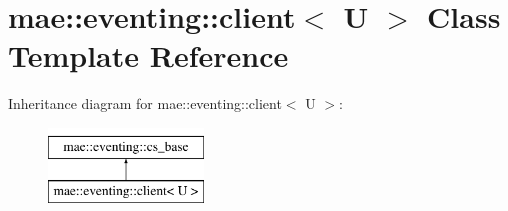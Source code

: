 \hypertarget{classmae_1_1eventing_1_1client}{\section{mae\-:\-:eventing\-:\-:client$<$ U $>$ Class Template Reference}
\label{classmae_1_1eventing_1_1client}
}
Inheritance diagram for mae\-:\-:eventing\-:\-:client$<$ U $>$\-:\begin{figure}[H]
\begin{center}
\leavevmode
\includegraphics[height=2.000000cm]{classmae_1_1eventing_1_1client}
\end{center}
\end{figure}
